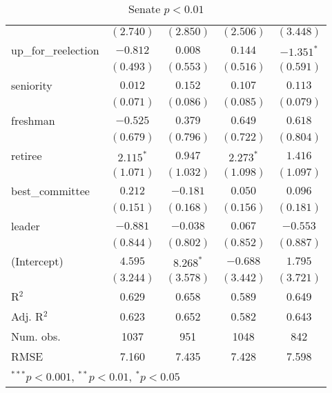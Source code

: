 \documentclass[12pt]{article}
\begin{document}
\begin{table}[ht]
\begin{center}
\begin{tabular}{l c c c c }
			& $(2.740)$      & $(2.850)$     & $(2.506)$      & $(3.448)$      \\
			up\_for\_reelection    & $-0.812$       & $0.008$       & $0.144$        & $-1.351^{*}$   \\
			& $(0.493)$      & $(0.553)$     & $(0.516)$      & $(0.591)$      \\
			seniority              & $0.012$        & $0.152$       & $0.107$        & $0.113$        \\
			& $(0.071)$      & $(0.086)$     & $(0.085)$      & $(0.079)$      \\
			freshman               & $-0.525$       & $0.379$       & $0.649$        & $0.618$        \\
			& $(0.679)$      & $(0.796)$     & $(0.722)$      & $(0.804)$      \\
			retiree                & $2.115^{*}$    & $0.947$       & $2.273^{*}$    & $1.416$        \\
			& $(1.071)$      & $(1.032)$     & $(1.098)$      & $(1.097)$      \\
			best\_committee        & $0.212$        & $-0.181$      & $0.050$        & $0.096$        \\
			& $(0.151)$      & $(0.168)$     & $(0.156)$      & $(0.181)$      \\
			leader                 & $-0.881$       & $-0.038$      & $0.067$        & $-0.553$       \\
			& $(0.844)$      & $(0.802)$     & $(0.852)$      & $(0.887)$      \\
			(Intercept)            & $4.595$        & $8.268^{*}$   & $-0.688$       & $1.795$        \\
			& $(3.244)$      & $(3.578)$     & $(3.442)$      & $(3.721)$      \\
			\hline
			R$^2$                  & 0.629          & 0.658         & 0.589          & 0.649          \\
			Adj. R$^2$             & 0.623          & 0.652         & 0.582          & 0.643          \\
			Num. obs.              & 1037           & 951           & 1048           & 842            \\
			RMSE                   & 7.160          & 7.435         & 7.428          & 7.598          \\
			\hline
			\multicolumn{5}{l}{\scriptsize{$^{***}p<0.001$, $^{**}p<0.01$, $^*p<0.05$}}
		\end{tabular}
		\caption{Senate $ p < 0.01 $}
	\end{center}
\end{table}
\end{document}
